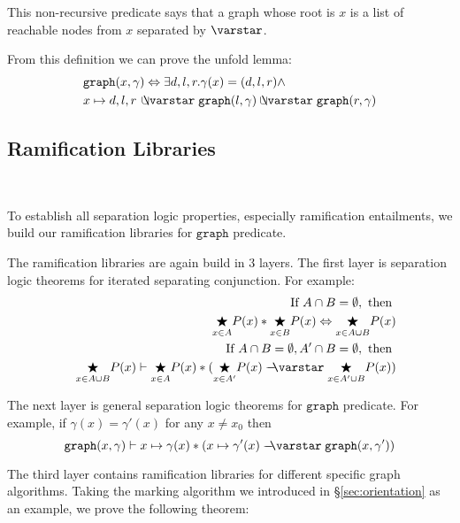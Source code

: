 This non-recursive predicate says that a graph whose root is $x$ is a
list of reachable nodes from $x$ separated by $\scon$.

\label{sec:foldunfold} From this definition we can prove the unfold lemma:
\begin{equation}\label{eqn:unfold_graph}
  \begin{split}
  & \mathtt{graph}(x, \gamma) \Leftrightarrow \exists d,l,r
    . \gamma(x)=(d,l,r) \wedge \\ & x \mapsto d,l,r\, \ocon
    \mathtt{graph}(l, \gamma) \ocon \mathtt{graph}(r, \gamma)
  \end{split}
\end{equation}


\subsection{Ramification Libraries}\

To establish all separation logic properties, especially ramification entailments, we build our ramification libraries for $\mathtt{graph}$ predicate.

The ramification libraries are again build in 3 layers. The first layer is separation logic theorems for iterated separating conjunction. For example:
\begin{eqnarray*}
&& \text{If }A \cap B = \emptyset, \text{ then } \\
&&  \underset{x\in A}{\bigstar} P(x) *   \underset{x\in B}{\bigstar} P(x) \Leftrightarrow \underset{x\in A \cup B}{\bigstar} P(x) \\
&& \text{If }A \cap B = \emptyset,  A' \cap B = \emptyset, \text{ then }\\
&& \underset{x\in A\cup B}{\bigstar} P(x) \vdash \underset{x\in A}{\bigstar} P(x) * ( \underset{x\in A'}{\bigstar} P(x) \wand \underset{x\in A' \cup B}{\bigstar} P(x))
\end{eqnarray*}

The next layer is general separation logic theorems for $\mathtt{graph}$ predicate. For example, if $\gamma(x) = \gamma'(x)$ for any $x \neq x_0$ then
$$\mathtt{graph}(x, \gamma) \vdash x \mapsto \gamma(x) * (x \mapsto \gamma'(x) \wand \mathtt{graph}(x, \gamma'))$$

The third layer contains ramification libraries for different specific graph algorithms. Taking the marking algorithm we introduced in \S\ref{sec:orientation} as an example, we prove the following theorem:

